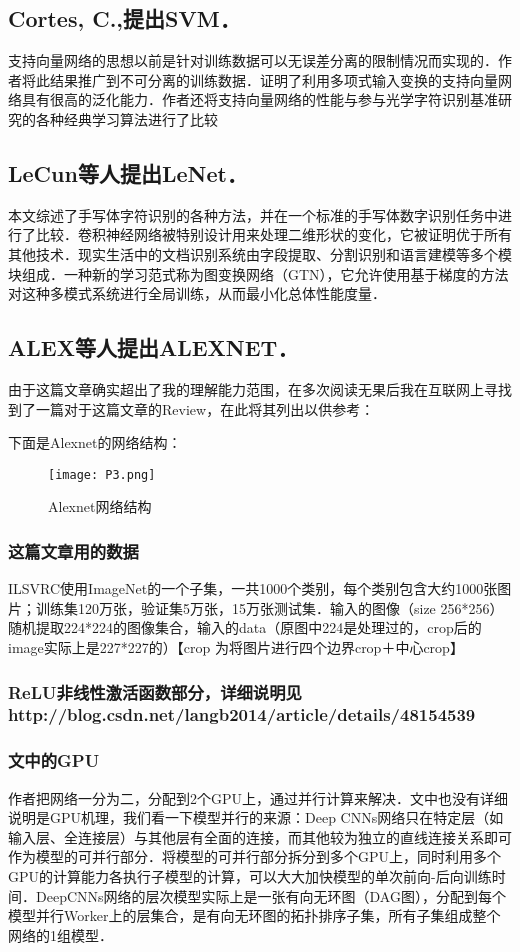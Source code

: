 \subsection{Cortes, C.,提出SVM．\cite{3}} 
支持向量网络的思想以前是针对训练数据可以无误差分离的限制情况而实现的．作者将此结果推广到不可分离的训练数据．证明了利用多项式输入变换的支持向量网络具有很高的泛化能力．作者还将支持向量网络的性能与参与光学字符识别基准研究的各种经典学习算法进行了比较
\subsection{LeCun等人提出LeNet．\cite{4}}
本文综述了手写体字符识别的各种方法，并在一个标准的手写体数字识别任务中进行了比较．卷积神经网络被特别设计用来处理二维形状的变化，它被证明优于所有其他技术．现实生活中的文档识别系统由字段提取、分割识别和语言建模等多个模块组成．一种新的学习范式称为图变换网络（GTN），它允许使用基于梯度的方法对这种多模式系统进行全局训练，从而最小化总体性能度量．
\subsection{ALEX等人提出ALEXNET．\cite{5}\cite{6}}
由于这篇文章确实超出了我的理解能力范围，在多次阅读无果后我在互联网上寻找到了一篇对于这篇文章的Review，在此将其列出以供参考：

下面是Alexnet的网络结构： 
\begin{figure}[htbp]
	\centering
	\texttt{[image: P3.png]}
	\caption{Alexnet网络结构}
	\label{figl}
\end{figure}
\subsubsection{这篇文章用的数据}       
ILSVRC使用ImageNet的一个子集，一共1000个类别，每个类别包含大约1000张图片；训练集120万张，验证集5万张，15万张测试集．输入的图像（size 256*256）随机提取224*224的图像集合，输入的data（原图中224是处理过的，crop后的image实际上是227*227的）【crop 为将图片进行四个边界crop＋中心crop】
\subsubsection{ReLU非线性激活函数部分，详细说明见http://blog.csdn.net/langb2014/article/details/48154539}
\subsubsection{文中的GPU}
作者把网络一分为二，分配到2个GPU上，通过并行计算来解决．文中也没有详细说明是GPU机理，我们看一下模型并行的来源：Deep CNNs网络只在特定层（如输入层、全连接层）与其他层有全面的连接，而其他较为独立的直线连接关系即可作为模型的可并行部分．将模型的可并行部分拆分到多个GPU上，同时利用多个GPU的计算能力各执行子模型的计算，可以大大加快模型的单次前向-后向训练时间．DeepCNNs网络的层次模型实际上是一张有向无环图（DAG图），分配到每个模型并行Worker上的层集合，是有向无环图的拓扑排序子集，所有子集组成整个网络的1组模型．
